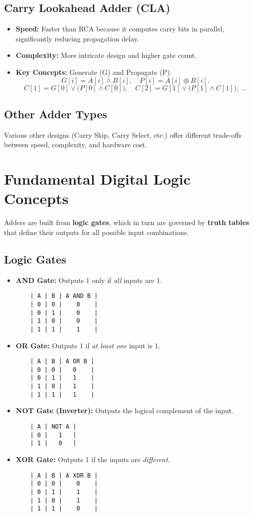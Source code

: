 \documentclass[12pt]{article}
\begin{document}
\subsection{Carry Lookahead Adder (CLA)}
\begin{itemize}
  \item \textbf{Speed:} Faster than RCA because it computes carry bits in parallel, significantly reducing propagation delay.
  \item \textbf{Complexity:} More intricate design and higher gate count.
  \item \textbf{Key Concepts:} Generate (G) and Propagate (P).
  \[
    G[i] = A[i] \land B[i], \quad P[i] = A[i] \oplus B[i].
  \]
  \[
    C[1] = G[0] \lor \bigl(P[0] \land C[0]\bigr), \quad
    C[2] = G[1] \lor \bigl(P[1] \land C[1]\bigr), \ \dots
  \]
\end{itemize}

\subsection{Other Adder Types}
Various other designs (Carry Skip, Carry Select, etc.) offer different trade-offs between speed, complexity, and hardware cost.

\section{Fundamental Digital Logic Concepts}
Adders are built from \textbf{logic gates}, which in turn are governed by \textbf{truth tables} that define their outputs for all possible input combinations.

\subsection{Logic Gates}
\begin{itemize}
  \item \textbf{AND Gate:} Outputs 1 only if \emph{all} inputs are 1.
    \begin{verbatim}
    | A | B | A AND B |
    | 0 | 0 |    0    |
    | 0 | 1 |    0    |
    | 1 | 0 |    0    |
    | 1 | 1 |    1    |
    \end{verbatim}
  \item \textbf{OR Gate:} Outputs 1 if \emph{at least one} input is 1.
    \begin{verbatim}
    | A | B | A OR B |
    | 0 | 0 |   0    |
    | 0 | 1 |   1    |
    | 1 | 0 |   1    |
    | 1 | 1 |   1    |
    \end{verbatim}
  \item \textbf{NOT Gate (Inverter):} Outputs the logical complement of the input.
    \begin{verbatim}
    | A | NOT A |
    | 0 |   1   |
    | 1 |   0   |
    \end{verbatim}
  \item \textbf{XOR Gate:} Outputs 1 if the inputs are \emph{different}.
    \begin{verbatim}
    | A | B | A XOR B |
    | 0 | 0 |    0    |
    | 0 | 1 |    1    |
    | 1 | 0 |    1    |
    | 1 | 1 |    0    |
    \end{verbatim}
\end{itemize}
\end{document}
